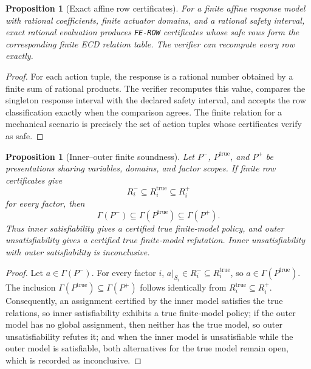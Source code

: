 \documentclass[11pt]{article}
\theoremstyle{plain}
\newtheorem{proposition}[theorem]{Proposition}
\theoremstyle{definition}
\theoremstyle{remark}
\begin{document}
\begin{proposition}[Exact affine row certificates]
\label{prop:exact-affine-row-certificates}
For a finite affine response model with rational coefficients, finite actuator
domains, and a rational safety interval, exact rational evaluation produces
\texttt{FE-ROW} certificates whose safe rows form the corresponding finite ECD
relation table.  The verifier can recompute every row exactly.
\end{proposition}

\begin{proof}
For each action tuple, the response is a rational number obtained by a finite
sum of rational products.  The verifier recomputes this value, compares the
singleton response interval with the declared safety interval, and accepts the
row classification exactly when the comparison agrees.  The finite relation for
a mechanical scenario is precisely the set of action tuples whose certificates
verify as safe.
\end{proof}

\begin{proposition}[Inner--outer finite soundness]
\label{prop:inner-outer-soundness}
Let \(P^-\), \(P^{\mathrm{true}}\), and \(P^+\) be presentations sharing
variables, domains, and factor scopes.  If finite row certificates give
\[
  R_i^-\subseteq R_i^{\mathrm{true}}\subseteq R_i^+
\]
for every factor, then
\[
  \Gamma(P^-)\subseteq\Gamma(P^{\mathrm{true}})\subseteq\Gamma(P^+).
\]
Thus inner satisfiability gives a certified true finite-model policy, and outer
unsatisfiability gives a certified true finite-model refutation.  Inner
unsatisfiability with outer satisfiability is inconclusive.
\end{proposition}

\begin{proof}
Let \(a\in\Gamma(P^-)\).  For every factor \(i\),
\(a|_{S_i}\in R_i^-\subseteq R_i^{\mathrm{true}}\), so
\(a\in\Gamma(P^{\mathrm{true}})\).  The inclusion
\(\Gamma(P^{\mathrm{true}})\subseteq\Gamma(P^+)\) follows identically from
\(R_i^{\mathrm{true}}\subseteq R_i^+\).  Consequently, an assignment certified
by the inner model satisfies the true relations, so inner satisfiability
exhibits a true finite-model policy; if the outer model has no global
assignment, then neither has the true model, so outer unsatisfiability refutes
it; and when the inner model is unsatisfiable while the outer model is
satisfiable, both alternatives for the true model remain open, which is
recorded as inconclusive.
\end{proof}
\end{document}
